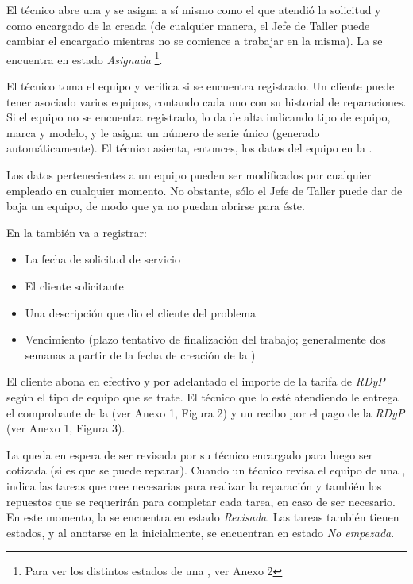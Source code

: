 \documentclass[12pt]{extarticle}
\begin{document}
\begin{spacing}{1.2}
   El técnico abre una \OT{} y se asigna a sí mismo como el que atendió la solicitud y como encargado de la \OT{} creada (de cualquier manera, el Jefe de Taller puede cambiar el encargado mientras no se comience a trabajar en la misma). La \OT{} se encuentra en estado \textit{Asignada} \footnote{Para ver los distintos estados de una \OT{}, ver Anexo 2}. 

    El técnico toma el equipo y verifica si se encuentra registrado. Un cliente puede tener asociado varios equipos, contando cada uno con su historial de reparaciones. Si el equipo no se encuentra registrado, lo da de alta indicando tipo de equipo, marca y modelo, y le asigna un número de serie único (generado automáticamente). El técnico asienta, entonces, los datos del equipo en la \OT{}.

    Los datos pertenecientes a un equipo pueden ser modificados por cualquier empleado en cualquier momento. No obstante, sólo el Jefe de Taller puede dar de baja un equipo, de modo que ya no puedan abrirse \OTs{} para éste.
   
    En la \OT{} también va a registrar:
    \begin{itemize}
        \item La fecha de solicitud de servicio
        \item El cliente solicitante
        \item Una descripción que dio el cliente del problema
        \item Vencimiento (plazo tentativo de finalización del trabajo; generalmente dos semanas a partir de la fecha de creación de la \OT{})
    \end{itemize}

    El cliente abona en efectivo y por adelantado el importe de la tarifa de \textit{RDyP} según el tipo de equipo que se trate. El técnico que lo esté atendiendo le entrega el comprobante de la \OT{} (ver Anexo 1, Figura 2) y un recibo por el pago de la \textit{RDyP} (ver Anexo 1, Figura 3). 


    La \OT{} queda en espera de ser revisada por su técnico encargado para luego ser cotizada (si es que se puede reparar).
    Cuando un técnico revisa el equipo de una \OT{}, indica las tareas que cree necesarias para realizar la reparación y también los repuestos que se requerirán para completar cada tarea, en caso de ser necesario. En este momento, la \OT{} se encuentra en estado \textit{Revisada}. Las tareas también tienen estados, y al anotarse en la \OT{} inicialmente, se encuentran en estado \textit{No empezada}.
    

\end{spacing}
\end{document}
